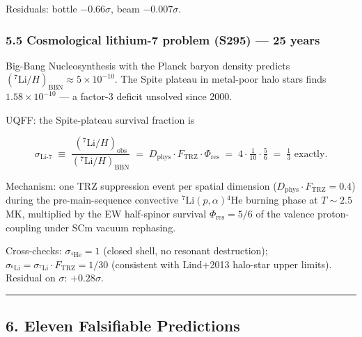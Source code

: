 \documentclass[
]{article}
\begin{document}
Residuals: bottle \(-0.66\sigma\), beam \(-0.007\sigma\).

\subsubsection{5.5 Cosmological lithium-7 problem (S295) --- 25
years}\label{cosmological-lithium-7-problem-s295-25-years}

Big-Bang Nucleosynthesis with the Planck baryon density predicts
\((^7\text{Li}/H)_{\text{BBN}} \approx 5\times 10^{-10}\). The Spite
plateau in metal-poor halo stars finds \(1.58\times 10^{-10}\) --- a
factor-3 deficit unsolved since 2000.

UQFF: the Spite-plateau survival fraction is

\[
\sigma_{\text{Li-7}} \;\equiv\; \frac{(^7\text{Li}/H)_{\text{obs}}}{(^7\text{Li}/H)_{\text{BBN}}} \;=\; D_{\text{phys}}\cdot F_{\text{TRZ}}\cdot \Phi_{\text{res}} \;=\; 4\cdot \tfrac{1}{10}\cdot \tfrac{5}{6} \;=\; \boxed{\tfrac{1}{3}} \text{ exactly.}
\]

Mechanism: one TRZ suppression event per spatial dimension
(\(D_{\text{phys}}\cdot F_{\text{TRZ}}=0.4\)) during the
pre-main-sequence convective
\({}^{7}\text{Li}(p,\alpha){}^{4}\text{He}\) burning phase at
\(T\sim 2.5\) MK, multiplied by the EW half-spinor survival
\(\Phi_{\text{res}}=5/6\) of the valence proton-coupling under SCm
vacuum rephasing.

Cross-checks: \(\sigma_{{}^{4}\text{He}}=1\) (closed shell, no resonant
destruction);
\(\sigma_{{}^{6}\text{Li}}=\sigma_{{}^{7}\text{Li}}\cdot F_{\text{TRZ}}=1/30\)
(consistent with Lind+2013 halo-star upper limits). Residual on
\(\sigma\): \(+0.28\sigma\).

\begin{center}\rule{0.5\linewidth}{0.5pt}\end{center}

\subsection{6. Eleven Falsifiable
Predictions}\label{eleven-falsifiable-predictions}
\end{document}
